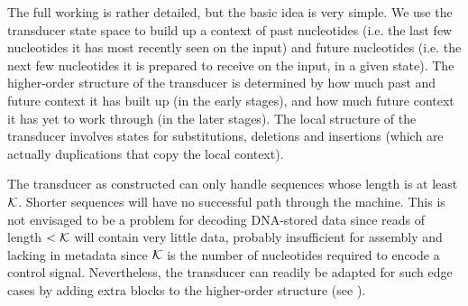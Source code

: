 \documentclass[english]{article}
\begin{document}
The full working is rather detailed, but the basic idea is very simple.
We use the transducer state space to build up a context of past nucleotides
(i.e. the last few nucleotides it has most recently seen on the input)
and future nucleotides
(i.e. the next few nucleotides it is prepared to receive on the input, in a given state).
The higher-order structure of the transducer is determined by how much past and future context it has built up
(in the early stages),
and how much future context it has yet to work through
(in the later stages).
The local structure of the transducer involves states for
substitutions, deletions
and insertions (which are actually duplications that copy the local context).

The transducer as constructed can only handle sequences whose length is at least ${\cal K}$.
Shorter sequences will have no successful path through the machine.
This is not envisaged to be a problem for decoding DNA-stored data
since reads of length $<{\cal K}$ will contain very little data,
probably insufficient for assembly and lacking in metadata
since ${\cal K}$ is the number of nucleotides required to encode a control signal.
Nevertheless, the transducer can readily be adapted for such edge cases
by adding extra blocks to the higher-order structure (see ).
\end{document}
